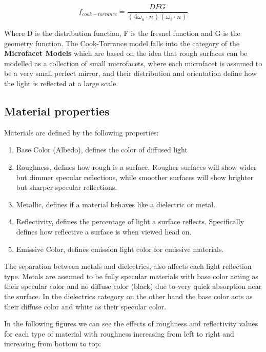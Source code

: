 $$f_{cook-torrance} = \frac{DFG}{(4 \omega_o \cdot n)(\omega_i \cdot n)}$$

Where D is the distribution function, F is the fresnel function and G is the geometry function.
The Cook-Torrance model falls into the category of the \textbf{Microfacet Models} which are based on the idea
that rough surfaces can be modelled as a collection of small microfacets, where each microfacet is assumed to be a very small perfect mirror,
and their distribution and orientation define how the light is reflected at a large scale.\cite{lighting:ref33}

\subsection{Material properties}
Materials are defined by the following properties:

\begin{enumerate}
    \item Base Color (Albedo), defines the color of diffused light
    \item Roughness, defines how rough is a surface. Rougher surfaces will show wider but dimmer specular reflections, while smoother
        surfaces will show brighter but sharper specular reflections.
    \item Metallic, defines if a material behaves like a dielectric or metal.
    \item Reflectivity, defines the percentage of light a surface reflects. Specifically defines how reflective a surface is when viewed
        head on.
    \item Emissive Color, defines emission light color for emissive materials.
\end{enumerate}

The separation between metals and dielectrics, also affects each light reflection type.
Metals are assumed to be fully specular materials with base color acting as their specular color and no diffuse color (black)
due to very quick absorption near the surface. In the dielectrics category on the other hand the base color acts as their diffuse
color and white as their specular color.

In the following figures we can see the effects of roughness and reflectivity values for each type of material with
roughness increasing from left to right and increasing from bottom to top:

